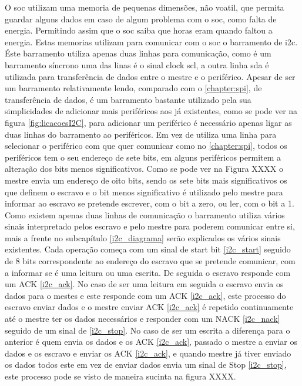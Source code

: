 O \acrshort{soc} utilizam uma memoria de pequenas dimensões, não voatil, que permita guardar alguns dados em caso de algum problema com o \acrshort{soc}, como falta de energia. Permitindo assim que o \acrshort{soc} saiba que horas eram quando faltou a energia. Estas memorias utilizam para comunicar com o \acrshort{soc} o barramento de \acrshort{i2c}. Éste barramento utiliza apenas duas linhas para comunicação, como é um barramento síncrono uma das linas é o sinal clock \acrshort{scl}, a outra linha \acrshort{sda} é utilizada para transferência de dados entre o mestre e o periférico. Apesar de ser um barramento relativamente lendo, comparado com o \ref{chapter:spi}, de transferência de dados, é um barramento bastante utilizado pela sua simplicidades de adicionar mais periféricos aos já existentes, como se pode ver na figura \ref{fig:licacoesI2C}, para adicionar um periférico é necessário apenas ligar as duas linhas do barramento ao periféricos. Em vez de utiliza uma linha para selecionar o periférico com que quer comunicar como no \ref{chapter:spi}, todos os periféricos tem o seu endereço de sete bits, em alguns periféricos permitem a alteração dos bits menos significativos. Como se pode ver na Figura XXXX o mestre envia um endereço de oito bits, sendo os sete bits mais significativos os que definem o escravo e o bit menos significativo é utilizado pelo mestre para informar ao escravo se pretende escrever, com o bit a zero, ou ler, com o bit a 1. Como existem apenas duas linhas de comunicação o barramento utiliza vários sinais interpretado pelos escravo e pelo mestre para poderem comunicar entre si, mais a frente no subcapítulo \ref{i2c_diagrama} serão explicados os vários sinais existentes. Cada operação começa com um sinal de start bit \ref{i2c_start} seguido de 8 bits correspondente ao endereço do escravo que se pretende comunicar, com a informar se é uma leitura ou uma escrita. De seguida o escravo responde com um ACK \ref{i2c_ack}. No caso de ser uma leitura em seguida o escravo envia os dados para o mestes e este responde com um ACK \ref{i2c_ack},  este processo do escravo enviar dados e o mestre enviar ACK \ref{i2c_ack} é repetido continuamente até o mestre ter os dados necessários e responder com um NACK \ref{i2c_nack} seguido de um sinal de \ref{i2c_stop}. No caso de ser um escrita a diferença para o anterior é quem envia os dados e os ACK \ref{i2c_ack}, passado o mestre a enviar os dados e os escravo e enviar os ACK \ref{i2c_ack}, e quando mestre já tiver enviado os dados todos este em vez de enviar dados envia um sinal de Stop \ref{i2c_stop}, este processo pode se visto de maneira sucinta na figura XXXX.


